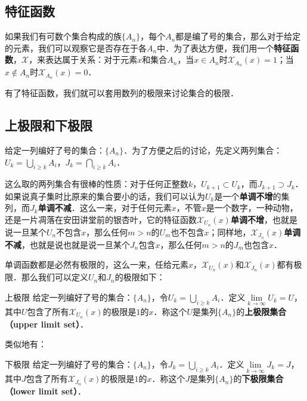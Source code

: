 
\subsection{特征函数}
如果我们有可数个集合构成的族$\{A_n\}$，每个$A_n$都是编了号的集合，那么对于给定的元素，我们可以观察它是否存在于各$A_n$中．为了表达方便，我们用一个\textbf{特征函数}，$\mathcal{X}$，来表达属于关系：对于元素$x$和集合$A_n$，当$x\in A_n$时$\mathcal{X}_{A_n}(x)=1$；当$x\not\in A_n$时$\mathcal{X}_{A_n}(x)=0$．

有了特征函数，我们就可以套用数列的极限来讨论集合的极限．

\subsection{上极限和下极限}
给定一列编好了号的集合：$\{A_n\}$．为了方便之后的讨论，先定义两列集合：$U_k=\bigcup_{i\ge k}A_i$，$J_k=\bigcap_{i\ge k}A_i$．

这么取的两列集合有很棒的性质：对于任何正整数$k$，$U_{k+1}\subset U_k$，而$J_{k+1}\supset J_k$．如果说真子集时比原来的集合要小的话，我们可以认为$U_k$是一个\textbf{单调不增}的集列，而$J_k$\textbf{单调不减}．这么一来，对于任何元素$x$，不管$x$是一个数字，一种动物，还是一片凋落在安田讲堂前的银杏叶，它的特征函数$\mathcal{X}_{U_n}(x)$\textbf{单调不增}，也就是说一旦某个$U_n$不包含$x$，那么任何$m>n$的$U_m$也不包含$x$；同样地，$\mathcal{X}_{J_n}(x)$\textbf{单调不减}，也就是说也就是说一旦某个$J_n$包含$x$，那么任何$m>n$的$J_m$也包含$x$．

单调函数都是必然有极限的，这么一来，任给元素$x$，$\mathcal{X}_{U_n}(x)$和$\mathcal{X}_{J_n}(x)$都有极限．那么我们可以定义$U_n$和$J_n$的极限如下：

\begin{definition}{上极限}
给定一列编好了号的集合：$\{A_n\}$，令$U_k=\bigcup_{i\ge k}A_i$．定义$\lim\limits_{k\rightarrow\infty} U_k=U$，其中$U$包含了所有$\mathcal{X}_{U_n}(x)$的极限是$1$的$x$．称这个$U$是集列$\{A_n\}$的\textbf{上极限集合（upper limit set）}．
\end{definition}

类似地有：

\begin{definition}{下极限}
给定一列编好了号的集合：$\{A_n\}$，令$J_k=\bigcup_{i\ge k}A_i$．定义$\lim\limits_{k\rightarrow\infty} J_k=J$，其中$J$包含了所有$\mathcal{X}_{J_n}(x)$的极限是$1$的$x$．称这个$J$是集列$\{A_n\}$的\textbf{下极限集合（lower limit set）}．
\end{definition}

